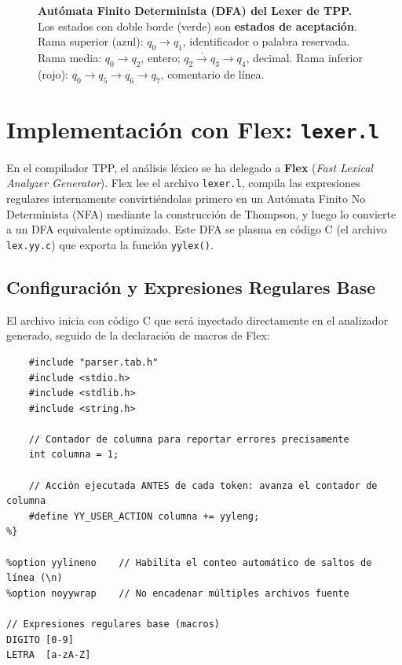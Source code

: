 \begin{figure}[H]
\begin{tikzpicture}
    \end{tikzpicture}
    \caption{%
        \textbf{Autómata Finito Determinista (DFA) del Lexer de TPP.}
        Los estados con doble borde (\textcolor{tppgreen!70!black}{verde}) son \textbf{estados de aceptación}.
        Rama superior (\textcolor{tppblue}{azul}): $q_0 \to q_1$, identificador o palabra reservada.
        Rama media: $q_0 \to q_2$, entero; $q_2 \xrightarrow{.} q_3 \to q_4$, decimal.
        Rama inferior (\textcolor{tppred}{rojo}): $q_0 \to q_5 \to q_6 \to q_7$, comentario de línea.
    }
    \label{fig:dfa_full}
\end{figure}

\section{Implementación con Flex: \texttt{lexer.l}}

En el compilador TPP, el análisis léxico se ha delegado a \textbf{Flex} (\textit{Fast Lexical Analyzer Generator}). Flex lee el archivo \texttt{lexer.l}, compila las expresiones regulares internamente convirtiéndolas primero en un Autómata Finito No Determinista (NFA) mediante la construcción de Thompson, y luego lo convierte a un DFA equivalente optimizado. Este DFA se plasma en código C (el archivo \texttt{lex.yy.c}) que exporta la función \texttt{yylex()}.

\subsection{Configuración y Expresiones Regulares Base}

El archivo inicia con código C que será inyectado directamente en el analizador generado, seguido de la declaración de macros de Flex:

\begin{lstlisting}[style=cstyle, caption={Sección de configuración del lexer}]
%{
    #include "parser.tab.h"
    #include <stdio.h>
    #include <stdlib.h>
    #include <string.h>
    
    // Contador de columna para reportar errores precisamente
    int columna = 1;
    
    // Acción ejecutada ANTES de cada token: avanza el contador de columna
    #define YY_USER_ACTION columna += yyleng;
%}

%option yylineno    // Habilita el conteo automático de saltos de línea (\n)
%option noyywrap    // No encadenar múltiples archivos fuente

// Expresiones regulares base (macros)
DIGITO [0-9]
LETRA  [a-zA-Z]
\end{lstlisting}

